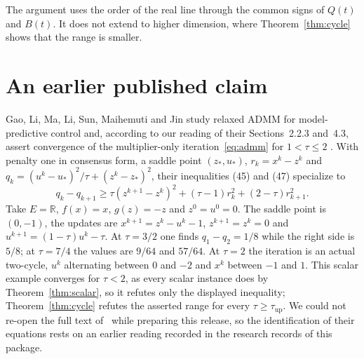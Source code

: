 \documentclass[11pt]{article}
\numberwithin{equation}{section}
\theoremstyle{definition}
\theoremstyle{remark}
\newcommand{\R}{\mathbb R}
\newcommand{\tauup}{\tau_{\mathrm{up}}}
\begin{document}
The argument uses the order of the real line through the common signs of $Q(t)$ and $B(t)$. It does not extend to higher dimension, where Theorem~\ref{thm:cycle} shows that the range is smaller.

\section{An earlier published claim}\label{sec:gao}
Gao, Li, Ma, Li, Sun, Maihemuti and Jin study relaxed ADMM for model-predictive control and, according to our reading of their Sections~2.2.3 and~4.3, assert convergence of the multiplier-only iteration~\eqref{eq:admm} for $1<\tau\le2$ \cite{Gao2022}. With penalty one in consensus form, a saddle point $(z_*,u_*)$, $r_k=x^k-z^k$ and $q_k=(u^k-u_*)^2/\tau+(z^k-z_*)^2$, their inequalities (45) and (47) specialize to
\[
q_k-q_{k+1}\ge\tau(z^{k+1}-z^k)^2+(\tau-1)r_k^2+(2-\tau)r_{k+1}^2.
\]
Take $E=\R$, $f(x)=x$, $g(z)=-z$ and $z^0=u^0=0$. The saddle point is $(0,-1)$, the updates are $x^{k+1}=z^k-u^k-1$, $z^{k+1}=z^k=0$ and $u^{k+1}=(1-\tau)u^k-\tau$. At $\tau=3/2$ one finds $q_1-q_2=1/8$ while the right side is $5/8$; at $\tau=7/4$ the values are $9/64$ and $57/64$. At $\tau=2$ the iteration is an actual two-cycle, $u^k$ alternating between $0$ and $-2$ and $x^k$ between $-1$ and $1$. This scalar example converges for $\tau<2$, as every scalar instance does by Theorem~\ref{thm:scalar}, so it refutes only the displayed inequality; Theorem~\ref{thm:cycle} refutes the asserted range for every $\tau\ge\tauup$. We could not re-open the full text of~\cite{Gao2022} while preparing this release, so the identification of their equations rests on an earlier reading recorded in the research records of this package.
\end{document}
